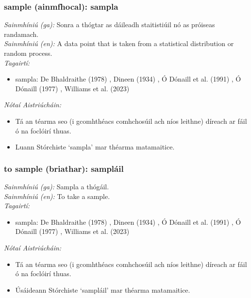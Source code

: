 \subsubsection*{sample (ainmfhocal): sampla}
 \noindent \textit{Sainmhíniú (ga):} Sonra a thógtar as dáileadh staitistiúil nó as próiseas randamach.
\\
 \noindent \textit{Sainmhíniú (en):} A data point that is taken from a statistical distribution or random process.
\\
 \noindent \textit{Tagairtí:}
\begin{itemize}
	\item sampla: De Bhaldraithe (1978) \cite{de-bhaldraithe}, Dineen (1934) \cite{dineen}, Ó Dónaill et al. (1991) \cite{focloir-beag}, Ó Dónaill (1977) \cite{odonaill}, Williams et al. (2023) \cite{storchiste}
\end{itemize}

 \noindent \textit{Nótaí Aistriúcháin:}
\begin{itemize}
	\item Tá an téarma seo (i gcomhthéacs comhchosúil ach níos leithne) díreach ar fáil ó na foclóirí thuas.
	\item Luann Stórchiste `sampla' mar théarma matamaitice.
\end{itemize}


\subsubsection*{to sample (briathar): sampláil}
 \noindent \textit{Sainmhíniú (ga):} Sampla a thógáil.
\\
 \noindent \textit{Sainmhíniú (en):} To take a sample.
\\
 \noindent \textit{Tagairtí:}
\begin{itemize}
	\item sampla: De Bhaldraithe (1978) \cite{de-bhaldraithe}, Dineen (1934) \cite{dineen}, Ó Dónaill et al. (1991) \cite{focloir-beag}, Ó Dónaill (1977) \cite{odonaill}, Williams et al. (2023) \cite{storchiste}
\end{itemize}

 \noindent \textit{Nótaí Aistriúcháin:}
\begin{itemize}
	\item Tá an téarma seo (i gcomhthéacs comhchosúil ach níos leithne) díreach ar fáil ó na foclóirí thuas.
	\item Úsáideann Stórchiste `sampláil' mar théarma matamaitice.
\end{itemize}


